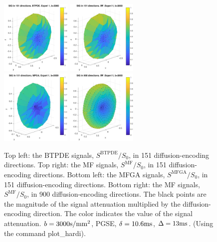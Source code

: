 \documentclass[a4paper]{article}
\begin{document}
\begin{figure}
    \centering
    \includegraphics[width=0.3\textwidth]{paper/SIG_BTPDE_151_experi1} \quad \quad
    \includegraphics[width=0.3\textwidth]{paper/SIG_MF_151_experi1} \\
    \vspace{0.6cm}
    \includegraphics[width=0.3\textwidth]{paper/SIG_MFGA_151_experi1} \quad\quad
    \includegraphics[width=0.3\textwidth]{paper/SIG_MF_900_experi1}
    \caption{Top left: the BTPDE signals, $S^\text{BTPDE}/S_0$, in 151 diffusion-encoding directions. Top right: the MF signals, $S^\text{MF}/S_0$, in 151 diffusion-encoding directions. Bottom left: the MFGA signals, $S^\text{MFGA}/S_0$, in 151 diffusion-encoding directions. Bottom right: the MF signals, $S^\text{MF}/S_0$, in 900 diffusion-encoding directions. The black points are the magnitude of the signal attenuation multiplied by the diffusion-encoding direction. The color indicates the value of the signal attenuation. $b=3000\mathrm{s}/\text{mm}^2$, PGSE, $\delta=10.6\mathrm{ms}$, $\Delta=13\mathrm{ms}$. (Using the command plot\_hardi).}
    \label{fig:sig_hardi_mf}
\end{figure}



\pagebreak





\end{document}
